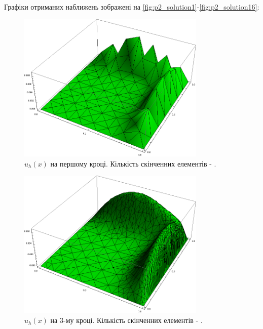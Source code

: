 Графіки отриманих наближень зображені на \autoref{fig:p2_solution1}-\ref{fig:p2_solution16}:
%
\begin{figure}[H]
	\centering
    \includegraphics[width=0.8\textwidth]{problem2/my/solutions/solution1}
    \caption{$u_h(x)$ на першому кроці. Кількість скінченних елементів - .}
    \label{fig:p2_solution1}
\end{figure}
%
\begin{figure}[H]
	\centering
    \includegraphics[width=0.8\textwidth]{problem2/my/solutions/solution3}
    \caption{$u_h(x)$ на 3-му кроці. Кількість скінченних елементів - .}
    \label{fig:p2_solution3}
\end{figure}
%
